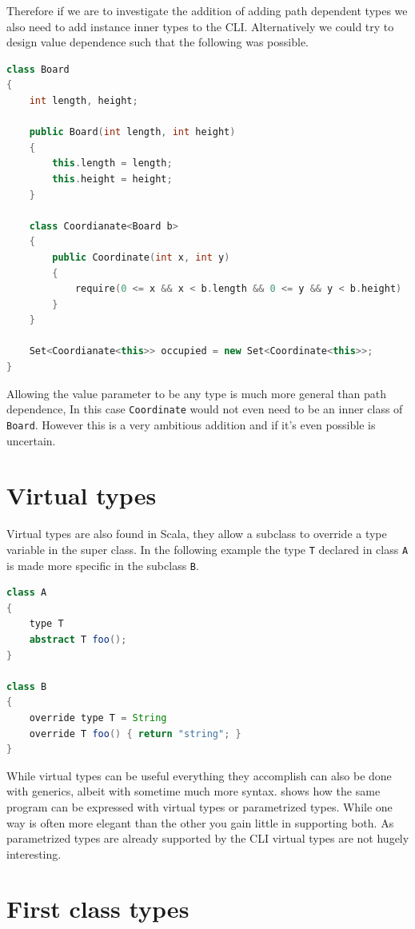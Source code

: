 \documentclass[english]{report}
\begin{document}
Therefore if we are to investigate the addition of adding path dependent
types we also need to add instance inner types to the CLI. Alternatively
we could try to design value dependence such that the following was
possible.

\begin{lstlisting}[keywordstyle={\color{blue}},language={C++}]
class Board
{
	int length, height;

	public Board(int length, int height)
	{
		this.length = length;
		this.height = height;
	}

	class Coordianate<Board b>
	{
		public Coordinate(int x, int y)
		{
			require(0 <= x && x < b.length && 0 <= y && y < b.height)
		}
	}

	Set<Coordianate<this>> occupied = new Set<Coordinate<this>>;
}
\end{lstlisting}


Allowing the value parameter to be any type is much more general than
path dependence, In this case \texttt{Coordinate} would not even need
to be an inner class of \texttt{Board}. However  this is a very ambitious
addition and if it's even possible is uncertain.


\section{Virtual types\label{sec:Virtual-types}}

Virtual types are also found in Scala, they allow a subclass to override
a type variable in the super class. In the following example the type
\texttt{T} declared in class \texttt{A} is made more specific in the
subclass \texttt{B}.

\begin{lstlisting}[keywordstyle={\color{blue}},language=Java]
class A
{
	type T
	abstract T foo();
}

class B 
{
	override type T = String
	override T foo() { return "string"; }
}
\end{lstlisting}


While virtual types can be useful everything they accomplish can also
be done with generics, albeit with sometime much more syntax. \cite{staticvts}
shows how the same program can be expressed with virtual types or
parametrized types. While one way is often more elegant than the other
you gain little in supporting both. As parametrized types are already
supported by the CLI virtual types are not hugely interesting.


\section{First class types}
\end{document}
